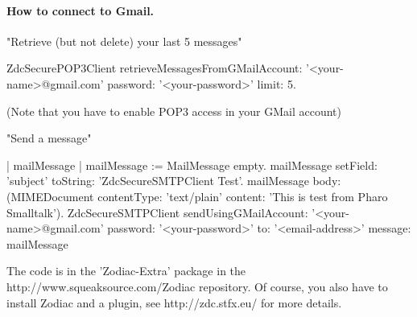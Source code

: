 \documentclass[a4paper,10pt,twoside]{book}
\begin{document}
\paragraph{How to connect to Gmail.}

\begin{code}{}
"Retrieve (but not delete) your last 5 messages" 

ZdcSecurePOP3Client 
       retrieveMessagesFromGMailAccount: '<your-name>@gmail.com' 
       password: '<your-password>' 
       limit: 5. 
\end{code}
(Note that you have to enable POP3 access in your GMail account) 


"Send a message" 
\begin{code}
| mailMessage | 
mailMessage := MailMessage empty. 
mailMessage setField: 'subject' toString: 'ZdcSecureSMTPClient Test'. 
mailMessage body: (MIMEDocument contentType: 'text/plain' content: 'This is test from Pharo Smalltalk'). 
ZdcSecureSMTPClient 
       sendUsingGMailAccount: '<your-name>@gmail.com' 
       password: '<your-password>' 
       to: '<email-address>' 
       message: mailMessage 
\end{code}

The code is in the 'Zodiac-Extra' package in the http://www.squeaksource.com/Zodiac repository. 
Of course, you also have to install Zodiac and a plugin, see http://zdc.stfx.eu/ for more details. 


\ifx\wholebook\relax\else
\end{document}
